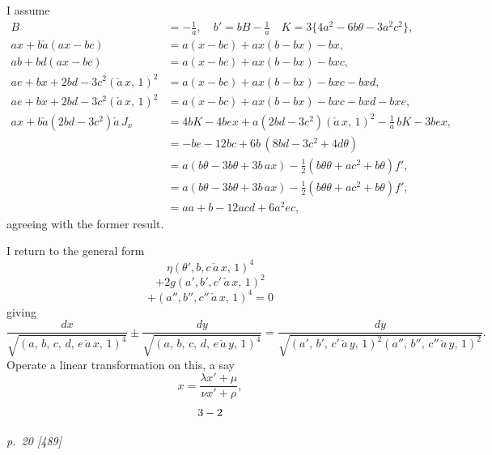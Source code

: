 ﻿\documentclass[11pt,a4paper]{article}
\theoremstyle{plain}
\theoremstyle{definition}
\begin{document}
I assume
\begin{align*}
B &= -\tfrac{1}{a}, \quad b' = bB - \tfrac{1}{a} \quad K = 3\{4a^2 - 6b\theta - 3a^2c^2\},\\
ax+b\check{a}(ax-bc) &= a(x-bc) + ax(b-bx) - bx,\\
ab+bd(ax-bc) &= a(x-bc) + ax(b-bx) - bxc,\\
ae+bx+2bd-3c^2(\check{a}\,x,\,1)^2 &= a(x-bc) + ax(b-bx) - bxc - bxd,\\
ae+bx+2bd-3c^2(\check{a}\,x,\,1)^2 &= a(x-bc) + ax(b-bx) - bxc - bxd - bxe,\\
ax+ b\check{a}(2bd-3c^2)\check{a}\,J_x &= 4bK - 4bex + a(2bd-3c^2)(\check{a}\,x,\,1)^2 - \tfrac{1}{a}\,bK - 3bex,\\
&= -be - 12bc + 6b\,(8bd - 3c^2 + 4d\theta)\\
&= a(b\theta - 3b\theta + 3b\,a x) - \tfrac{1}{2}(b\theta\theta + a c^2 + b\theta) f',\\
&= a(b\theta - 3b\theta + 3b\,a x) - \tfrac{1}{2}(b\theta\theta + a c^2 + b\theta) f',\\
&= aa + b - 12acd + 6a^2 ec,
\end{align*}
agreeing with the former result.

I return to the general form
\[
\eta(\theta', b, c\,\check{a}\,x,\,1)^4
\]
\[
+ 2g(a', b', c'\,\check{a}\,x,\,1)^2
\]
\[
+ (a'', b'', c''\,\check{a}\,x,\,1)^4 = 0
\]
giving
\[
\frac{dx}{\sqrt{(a,\,b,\,c,\,d,\,e\,\check{a}\,x,\,1)^4}} \pm \frac{dy}{\sqrt{(a,\,b,\,c,\,d,\,e\,\check{a}\,y,\,1)^4}} = \frac{dy}{\sqrt{(a',\,b',\,c'\,\check{a}\,y,\,1)^2(a'',\,b'',\,c''\,\check{a}\,y,\,1)^2}}.
\]
Operate a linear transformation on this, a say
\[
x = \frac{\lambda x' + \mu}{\nu x' + \rho},
\]
\[
\hfill 3-2
\]

\clearpage

\bigskip
\textit{p.~20 [489]}
\smallskip
\end{document}
